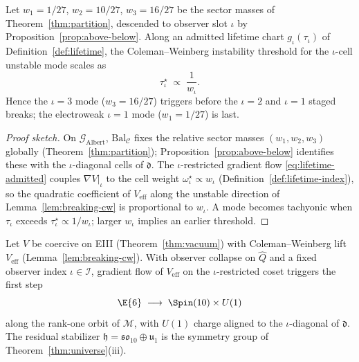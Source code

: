 \begin{lemma}
\label{lem:breaking-capacity-order}
Let $w_1=1/27$, $w_2=10/27$, $w_3=16/27$ be the sector masses of
Theorem~\ref{thm:partition}, descended to observer slot $\iota$ by
Proposition~\ref{prop:above-below}. Along an admitted lifetime chart
$g_\iota(\tau_\iota)$ of Definition~\ref{def:lifetime}, the Coleman--Weinberg
instability threshold for the $\iota$-cell unstable mode scales as
\begin{equation}\label{eq:breaking-threshold}
  \tau_\iota^\star \;\propto\; \frac{1}{w_\iota}.
\end{equation}
Hence the $\iota=3$ mode ($w_3=16/27$) triggers before the $\iota=2$ and
$\iota=1$ staged breaks; the electroweak $\iota=1$ mode ($w_1=1/27$) is last.
\end{lemma}

\begin{proof}[Proof sketch]
On $\mathcal{G}_{\mathrm{Albert}}$, $\mathrm{Bal}_{\mathcal{C}}$ fixes the
relative sector masses $(w_1,w_2,w_3)$ globally (Theorem~\ref{thm:partition});
Proposition~\ref{prop:above-below} identifies these with the $\iota$-diagonal
cells of $\mathfrak{d}$. The $\iota$-restricted gradient flow
\eqref{eq:lifetime-admitted} couples $\nabla V|_\iota$ to the cell weight
$\omega^\star_\iota\propto w_\iota$ (Definition~\ref{def:lifetime-index}), so
the quadratic coefficient of $V_{\mathrm{eff}}$ along the unstable direction
of Lemma~\ref{lem:breaking-cw} is proportional to $w_\iota$. A mode becomes
tachyonic when $\tau_\iota$ exceeds $\tau_\iota^\star\propto 1/w_\iota$; larger
$w_\iota$ implies an earlier threshold.
\end{proof}

\begin{theorem}\label{thm:breaking-e6so10}
Let $V$ be coercive on EIII (Theorem~\ref{thm:vacuum}) with Coleman--Weinberg
lift $V_{\mathrm{eff}}$ (Lemma~\ref{lem:breaking-cw}). With observer collapse on
$\hat Q$ and a fixed observer index $\iota\in\mathcal{I}$, gradient flow of
$V_{\mathrm{eff}}$ on the $\iota$-restricted coset triggers the first step
\begin{equation}\label{eq:breaking-e6so10}
  \E{6}\;\longrightarrow\; \Spin(10)\times U(1)
\end{equation}
along the rank-one orbit of $\mathcal{M}$, with $U(1)$ charge aligned to the
$\iota$-diagonal of $\mathfrak{d}$. The residual stabilizer
$\mathfrak{h}=\mathfrak{so}_{10}\oplus\mathfrak{u}_1$ is the symmetry group of
Theorem~\ref{thm:universe}(iii).
\end{theorem}

